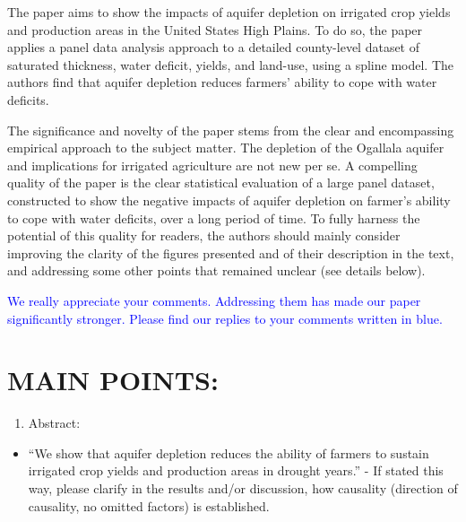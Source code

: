 \documentclass[
]{article}
\author{}
\date{\vspace{-2.5em}}
\providecommand{\tightlist}{%
  \setlength{\itemsep}{0pt}\setlength{\parskip}{0pt}}
\begin{document}
The paper aims to show the impacts of aquifer depletion on irrigated
crop yields and production areas in the United States High Plains. To do
so, the paper applies a panel data analysis approach to a detailed
county-level dataset of saturated thickness, water deficit, yields, and
land-use, using a spline model. The authors find that aquifer depletion
reduces farmers' ability to cope with water deficits.

The significance and novelty of the paper stems from the clear and
encompassing empirical approach to the subject matter. The depletion of
the Ogallala aquifer and implications for irrigated agriculture are not
new per se. A compelling quality of the paper is the clear statistical
evaluation of a large panel dataset, constructed to show the negative
impacts of aquifer depletion on farmer's ability to cope with water
deficits, over a long period of time. To fully harness the potential of
this quality for readers, the authors should mainly consider improving
the clarity of the figures presented and of their description in the
text, and addressing some other points that remained unclear (see
details below).

\textcolor{blue}{We really appreciate your comments. Addressing them has made our paper significantly stronger. Please find our replies to your comments written in blue.}

\hypertarget{main-points}{%
\section{MAIN POINTS:}\label{main-points}}

\begin{enumerate}
\def\labelenumi{\arabic{enumi}.}
\tightlist
\item
  Abstract:
\end{enumerate}

\begin{itemize}
\tightlist
\item
  ``We show that aquifer depletion reduces the ability of farmers to
  sustain irrigated crop yields and production areas in drought years.''
  - If stated this way, please clarify in the results and/or discussion,
  how causality (direction of causality, no omitted factors) is
  established.
\end{itemize}
\end{document}
